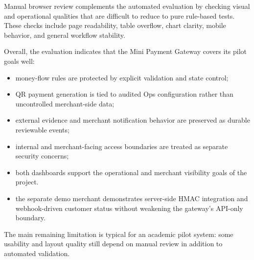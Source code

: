 Manual browser review complements the automated evaluation by checking visual
and operational qualities that are difficult to reduce to pure rule-based
tests. These checks include page readability, table overflow, chart clarity,
mobile behavior, and general workflow stability.

Overall, the evaluation indicates that the Mini Payment Gateway covers its pilot
goals well:

\begin{itemize}
  \item money-flow rules are protected by explicit validation and state control;
  \item QR payment generation is tied to audited Ops configuration rather than
  uncontrolled merchant-side data;
  \item external evidence and merchant notification behavior are preserved as
  durable reviewable events;
  \item internal and merchant-facing access boundaries are treated as separate
  security concerns;
  \item both dashboards support the operational and merchant visibility goals of
  the project.
  \item the separate demo merchant demonstrates server-side HMAC integration
  and webhook-driven customer status without weakening the gateway's API-only
  boundary.
\end{itemize}

The main remaining limitation is typical for an academic pilot system: some
usability and layout quality still depend on manual review in addition to
automated validation.
